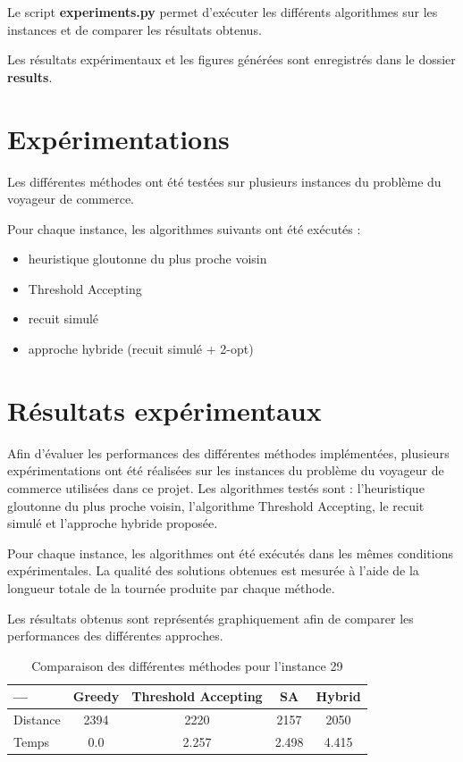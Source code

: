 \documentclass[11pt,a4paper]{article}
\begin{document}
	Le script \textbf{experiments.py} permet d'exécuter les différents algorithmes sur les instances et de comparer les résultats obtenus.
	
	Les résultats expérimentaux et les figures générées sont enregistrés dans le dossier \textbf{results}.
	
	
	\section{Expérimentations}
	
	Les différentes méthodes ont été testées sur plusieurs instances du problème du voyageur de commerce.
	
	Pour chaque instance, les algorithmes suivants ont été exécutés :
	
	\begin{itemize}
		\item heuristique gloutonne du plus proche voisin
		\item Threshold Accepting
		\item recuit simulé
		\item approche hybride (recuit simulé + 2-opt)
	\end{itemize}
	
	\section{Résultats expérimentaux}
	
	Afin d’évaluer les performances des différentes méthodes implémentées, plusieurs expérimentations ont été réalisées sur les instances du problème du voyageur de commerce utilisées dans ce projet. Les algorithmes testés sont : l’heuristique gloutonne du plus proche voisin, l’algorithme Threshold Accepting, le recuit simulé et l’approche hybride proposée.
	
	Pour chaque instance, les algorithmes ont été exécutés dans les mêmes conditions expérimentales. La qualité des solutions obtenues est mesurée à l’aide de la longueur totale de la tournée produite par chaque méthode.
	
	Les résultats obtenus sont représentés graphiquement afin de comparer les performances des différentes approches.
	
	\begin{table}[h]
		\centering
		\begin{tabular}{lcccc}
			\toprule
			--- & Greedy & Threshold Accepting & SA & Hybrid \\
			\midrule
			Distance & 2394 & 2220 & 2157 & 2050 \\
			Temps & 0.0 & 2.257 & 2.498 & 4.415 \\
			
			\bottomrule
		\end{tabular}
		\caption{Comparaison des différentes méthodes pour l'instance 29}
	\end{table}
	
\end{document}
